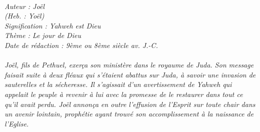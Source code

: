\BFont
\noindent\hrulefill
{\footnotesize
\textit{
\bigskip
{\centering{}
\\Auteur : Joël
\\(Heb. : Yoël)
\\Signification : Yahweh est Dieu
\\Thème : Le jour de Dieu
\\Date de rédaction : 9ème ou 8ème siècle av. J.-C.\\}
}
\textit{
\\Joël, fils de Pethuel, exerça son ministère dans le royaume de Juda. Son message faisait suite à deux fléaux qui s’étaient abattus sur Juda, à savoir une invasion de sauterelles et la sécheresse. Il s’agissait d’un avertissement de Yahweh qui appelait le peuple à revenir à lui avec la promesse de le restaurer dans tout ce qu’il avait perdu. Joël annonça en outre l’effusion de l’Esprit sur toute chair dans un avenir lointain, prophétie ayant trouvé son accomplissement à la naissance de l’Eglise.\bigskip
}
}
\par\nobreak\noindent\hrulefill
